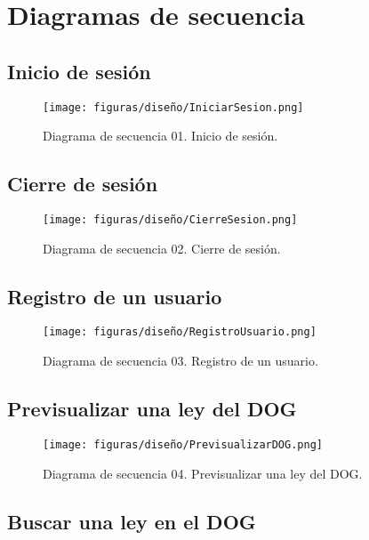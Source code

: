 \chapter{Diagramas de secuencia}
\label{enlaceDiagramasSecuencia}

\section{Inicio de sesión}

\begin{figure}[H]
\centerline{\texttt{[image: figuras/diseño/IniciarSesion.png]}}
\caption{Diagrama de secuencia 01. Inicio de sesión.}
\label{enlaceDInicioSesion}
\end{figure}


\section{Cierre de sesión}

\begin{figure}[H]
\centerline{\texttt{[image: figuras/diseño/CierreSesion.png]}}
\caption{Diagrama de secuencia 02. Cierre de sesión.}
\label{enlaceDCierreSesion}
\end{figure}


\section{Registro de un usuario}

\begin{figure}[H]
\centerline{\texttt{[image: figuras/diseño/RegistroUsuario.png]}}
\caption{Diagrama de secuencia 03. Registro de un usuario.}
\label{enlaceDRegistro}
\end{figure}


\section{Previsualizar una ley del DOG}

\begin{figure}[H]
\centerline{\texttt{[image: figuras/diseño/PrevisualizarDOG.png]}}
\caption{Diagrama de secuencia 04. Previsualizar una ley del DOG.}
\label{enlaceDPrevisualizarDOG}
\end{figure}


\section{Buscar una ley en el DOG}

